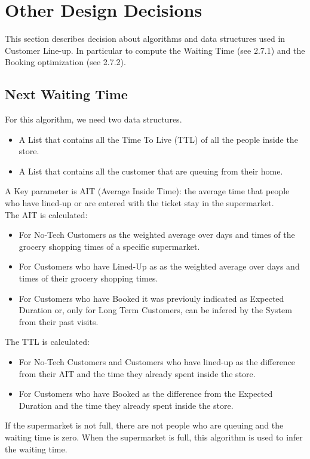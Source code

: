 \section{Other Design Decisions}

This section describes decision about algorithms and data structures used in Customer Line-up. In particular to compute the Waiting Time (see 2.7.1) and the Booking optimization (see 2.7.2).


\subsection{Next Waiting Time}

For this algorithm, we need two data structures.
\begin{itemize}
	\item A List that contains all the Time To Live (TTL) of all the people inside the store.
	\item A List that contains all the customer that are queuing from their home.
\end{itemize}
A Key parameter is AIT (Average Inside Time): the average time that people who have lined-up or are entered with the ticket stay in the supermarket.\\
The AIT is calculated:
\begin{itemize}
	\item For No-Tech Customers as the weighted average over days and times of the grocery shopping times of a specific supermarket.
	\item For Customers who have Lined-Up as as the weighted average over days and times of their grocery shopping times.
	\item For Customers who have Booked it was previouly indicated as Expected Duration or, only for Long Term Customers, can be infered by the System from their past visits.
\end{itemize}
The TTL is calculated:
\begin{itemize}
	\item For No-Tech Customers and Customers who have lined-up as the difference from their AIT and the time they already spent inside the store.
	\item For Customers who have Booked as the difference from the Expected Duration and the time they already spent inside the store.
\end{itemize}
If the supermarket is not full, there are not people who are queuing and the waiting time is zero. When the supermarket is full, this algorithm is used to infer the waiting time.\\


